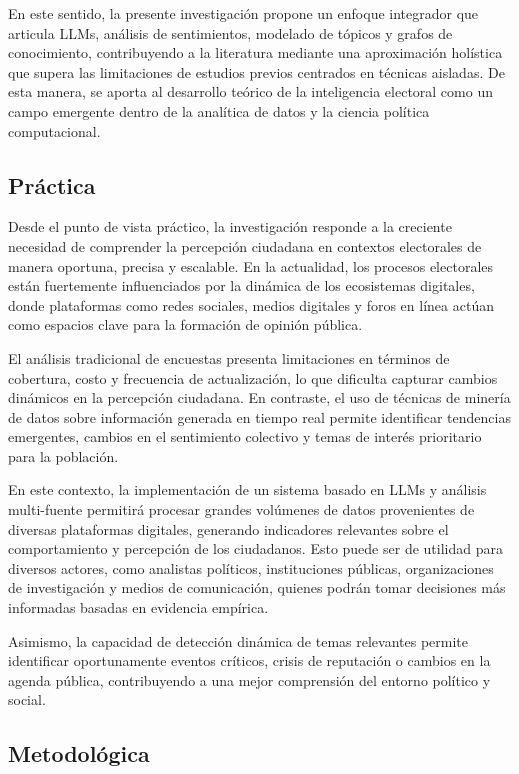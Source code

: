 \documentclass[listof=nochaptergap,12pt,times,authoryear]{report}
\begin{document}
En este sentido, la presente investigación propone un enfoque integrador que articula LLMs, análisis de sentimientos, modelado de tópicos y grafos de conocimiento, contribuyendo a la literatura mediante una aproximación holística que supera las limitaciones de estudios previos centrados en técnicas aisladas. De esta manera, se aporta al desarrollo teórico de la inteligencia electoral como un campo emergente dentro de la analítica de datos y la ciencia política computacional.

\subsection{Práctica}

Desde el punto de vista práctico, la investigación responde a la creciente necesidad de comprender la percepción ciudadana en contextos electorales de manera oportuna, precisa y escalable. En la actualidad, los procesos electorales están fuertemente influenciados por la dinámica de los ecosistemas digitales, donde plataformas como redes sociales, medios digitales y foros en línea actúan como espacios clave para la formación de opinión pública.

El análisis tradicional de encuestas presenta limitaciones en términos de cobertura, costo y frecuencia de actualización, lo que dificulta capturar cambios dinámicos en la percepción ciudadana. En contraste, el uso de técnicas de minería de datos sobre información generada en tiempo real permite identificar tendencias emergentes, cambios en el sentimiento colectivo y temas de interés prioritario para la población.

En este contexto, la implementación de un sistema basado en LLMs y análisis multi-fuente permitirá procesar grandes volúmenes de datos provenientes de diversas plataformas digitales, generando indicadores relevantes sobre el comportamiento y percepción de los ciudadanos. Esto puede ser de utilidad para diversos actores, como analistas políticos, instituciones públicas, organizaciones de investigación y medios de comunicación, quienes podrán tomar decisiones más informadas basadas en evidencia empírica.

Asimismo, la capacidad de detección dinámica de temas relevantes permite identificar oportunamente eventos críticos, crisis de reputación o cambios en la agenda pública, contribuyendo a una mejor comprensión del entorno político y social.

\subsection{Metodológica}
\end{document}
